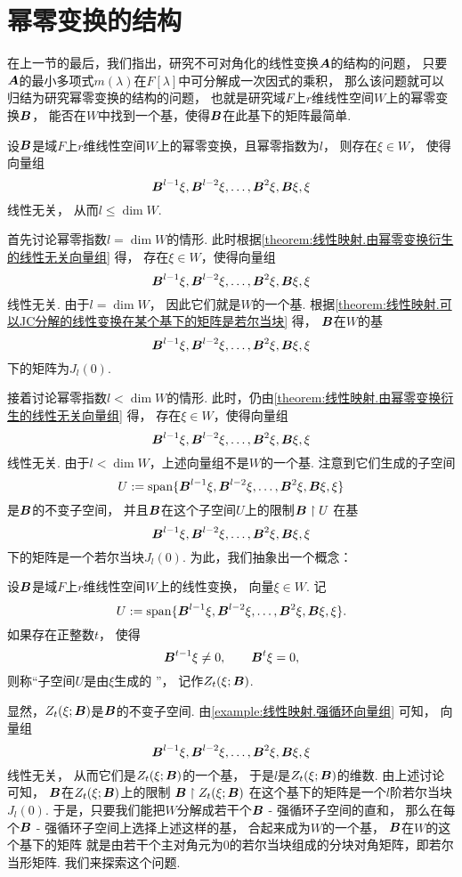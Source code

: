 \section{幂零变换的结构}
在上一节的最后，我们指出，研究不可对角化的线性变换\(\boldsymbol{A}\)的结构的问题，
只要\(\boldsymbol{A}\)的最小多项式\(m(\lambda)\)在\(F[\lambda]\)中可分解成一次因式的乘积，
那么该问题就可以归结为研究幂零变换的结构的问题，
也就是研究域\(F\)上\(r\)维线性空间\(W\)上的幂零变换\(\boldsymbol{B}\)，
能否在\(W\)中找到一个基，使得\(\boldsymbol{B}\)在此基下的矩阵最简单.

\begin{proposition}\label{theorem:线性映射.由幂零变换衍生的线性无关向量组}
设\(\boldsymbol{B}\)是域\(F\)上\(r\)维线性空间\(W\)上的幂零变换，且幂零指数为\(l\)，
则存在\(\xi \in W\)，
使得向量组\[
	\boldsymbol{B}^{l-1}\xi,
	\boldsymbol{B}^{l-2}\xi,
	\dotsc,
	\boldsymbol{B}^2\xi,
	\boldsymbol{B}\xi,
	\xi
\]线性无关，
从而\(l \leq \dim W\).
\end{proposition}

\def\BasisL{\vb{B}^{l-1}\xi,\vb{B}^{l-2}\xi,\dotsc,\vb{B}^2\xi,\vb{B}\xi,\xi}
首先讨论幂零指数\(l = \dim W\)的情形.
此时根据\cref{theorem:线性映射.由幂零变换衍生的线性无关向量组} 得，
存在\(\xi \in W\)，使得向量组\[
	\BasisL
\]线性无关.
由于\(l = \dim W\)，
因此它们就是\(W\)的一个基.
根据\cref{theorem:线性映射.可以JC分解的线性变换在某个基下的矩阵是若尔当块} 得，
\(\boldsymbol{B}\)在\(W\)的基\[
	\BasisL
\]下的矩阵为\(J_l(0)\).

接着讨论幂零指数\(l < \dim W\)的情形.
此时，仍由\cref{theorem:线性映射.由幂零变换衍生的线性无关向量组} 得，
存在\(\xi \in W\)，使得向量组\[
	\BasisL
\]线性无关.
由于\(l < \dim W\)，上述向量组不是\(W\)的一个基.
注意到它们生成的子空间\[
	U \defeq \Span\{\BasisL\}
\]是\(\boldsymbol{B}\)的不变子空间，
并且\(\boldsymbol{B}\)在这个子空间\(U\)上的限制\(\boldsymbol{B} \upharpoonright U\)
在基\[
	\BasisL
\]下的矩阵是一个若尔当块\(J_l(0)\).
为此，我们抽象出一个概念：
\begin{definition}\label{definition:线性映射.生成强循环子空间}
设\(\boldsymbol{B}\)是域\(F\)上\(r\)维线性空间\(W\)上的线性变换，
向量\(\xi \in W\).
记\[
	U \defeq \Span\{\BasisL\}.
\]
如果存在正整数\(t\)，
使得\[
	\boldsymbol{B}^{t-1} \xi \neq 0,
	\qquad
	\boldsymbol{B}^t \xi = 0,
\]
则称“子空间\(U\)是由\(\xi\)生成的 ”，
记作\(Z_t(\xi;\boldsymbol{B})\).
\end{definition}

显然，\(Z_t(\xi;\boldsymbol{B})\)是\(\boldsymbol{B}\)的不变子空间.
由\cref{example:线性映射.强循环向量组} 可知，
向量组\begin{equation*}
	\BasisL
\end{equation*}线性无关，
从而它们是\(Z_t(\xi;\boldsymbol{B})\)的一个基，
于是\(l\)是\(Z_t(\xi;\boldsymbol{B})\)的维数.
由上述讨论可知，
\(\boldsymbol{B}\)在\(Z_t(\xi;\boldsymbol{B})\)上的限制
\(\boldsymbol{B} \upharpoonright Z_t(\xi;\boldsymbol{B})\)
在这个基下的矩阵是一个\(l\)阶若尔当块\(J_l(0)\).
于是，只要我们能把\(W\)分解成若干个\(\boldsymbol{B}\) - 强循环子空间的直和，
那么在每个\(\boldsymbol{B}\) - 强循环子空间上选择上述这样的基，
合起来成为\(W\)的一个基，
\(\boldsymbol{B}\)在\(W\)的这个基下的矩阵
就是由若干个主对角元为\(0\)的若尔当块组成的分块对角矩阵，即若尔当形矩阵.
我们来探索这个问题.

